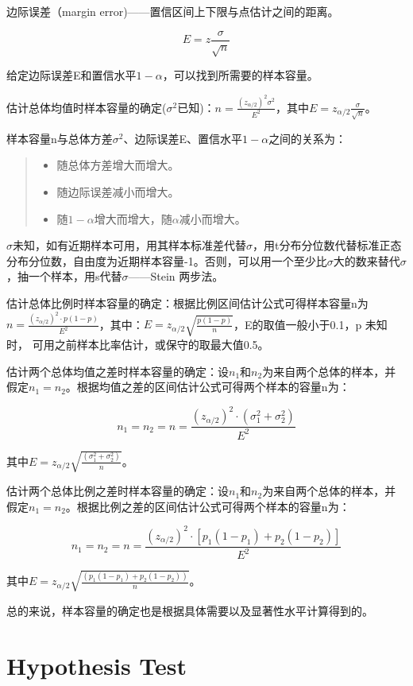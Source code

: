 \documentclass[]{ctexbook}
\providecommand{\tightlist}{%
  \setlength{\itemsep}{0pt}\setlength{\parskip}{0pt}}
\begin{document}
边际误差（margin error)------置信区间上下限与点估计之间的距离。

\[ E=z\frac{\sigma}{\sqrt{n}} \]

给定边际误差E和置信水平\(1-\alpha\)，可以找到所需要的样本容量。

估计总体均值时样本容量的确定(\(\sigma^2\)已知)：\(n=\frac{(z_{\alpha/2})^2\sigma^2}{E^2}\)，其中\(E=z_{\alpha/2}\frac{\sigma}{\sqrt{n}}\)。

样本容量n与总体方差\(\sigma^2\)、边际误差E、置信水平\(1-\alpha\)之间的关系为：

\begin{quote}
\begin{itemize}
\tightlist
\item
  随总体方差增大而增大。
\item
  随边际误差减小而增大。
\item
  随\(1-\alpha\)增大而增大，随\(\alpha\)减小而增大。
\end{itemize}
\end{quote}

\(\sigma\)未知，如有近期样本可用，用其样本标准差代替\(\sigma\)，用t分布分位数代替标准正态分布分位数，自由度为近期样本容量-1。否则，可以用一个至少比\(\sigma\)大的数来替代\(\sigma\)，抽一个样本，用s代替\(\sigma\)------Stein 两步法。

估计总体比例时样本容量的确定：根据比例区间估计公式可得样本容量n为\(n=\frac{(z_{\alpha/2})^2\cdot p(1-p)}{E^2}\)，其中：\(E=z_{\alpha/2}\sqrt{\frac{p(1-p)}{n}}\)，E的取值一般小于0.1，p 未知时， 可用之前样本比率估计，或保守的取最大值0.5。

估计两个总体均值之差时样本容量的确定：设\(n_1\)和\(n_2\)为来自两个总体的样本，并假定\(n_1=n_2\)。根据均值之差的区间估计公式可得两个样本的容量n为：

\[n_1=n_2=n=\frac{(z_{\alpha/2})^2\cdot (\sigma_1^2+\sigma_2^2)}{E^2}\]

其中\(E=z_{\alpha/2}\sqrt{\frac{(\sigma_1^2+\sigma_2^2)}{n}}\)。

估计两个总体比例之差时样本容量的确定：设\(n_1\)和\(n_2\)为来自两个总体的样本，并假定\(n_1=n_2\)。根据比例之差的区间估计公式可得两个样本的容量n为：

\[n_1=n_2=n=\frac{(z_{\alpha/2})^2\cdot [p_1(1-p_1)+p_2(1-p_2)]}{E^2}\]

其中\(E=z_{\alpha/2}\sqrt{\frac{(p_1(1-p_1)+p_2(1-p_2))}{n}}\)。

总的来说，样本容量的确定也是根据具体需要以及显著性水平计算得到的。

\hypertarget{hypothesis}{%
\chapter{Hypothesis Test}\label{hypothesis}}
\end{document}
